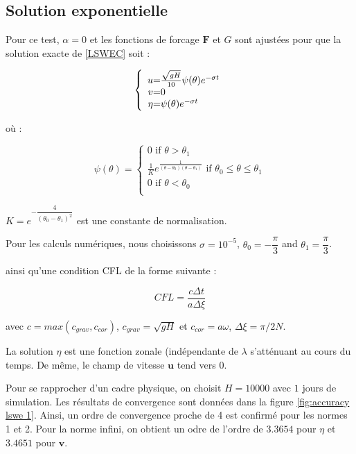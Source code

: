 \subsection{Solution exponentielle}

Pour ce test, $\alpha = 0$ et les fonctions de forcage $\mathbf{F}$ et $G$ sont ajustées pour que la solution exacte de \eqref{LSWEC} soit :

\begin{equation}
\left\lbrace
\begin{array}{r @{=} l}
u & \frac{\sqrt{gH}}{10} \psi ( \theta )  e^{-\sigma t} \\
v & 0 \\
\eta & \psi( \theta ) e^{-\sigma t}
\end{array}
\right.
\end{equation}

où :

\begin{equation*}
\psi ( \theta ) = 
\left\lbrace
\begin{array}{l}
0 \text{ if } \theta > \theta_1\\
\frac{1}{K}e^{\frac{1}{(\theta - \theta_0)(\theta-\theta_1)}} \text{ if } \theta_0 \leq \theta \leq \theta_1 \\
0 \text{ if } \theta < \theta_0\\
 
\end{array}
\right.
\label{galewski_fun}
\end{equation*}

$K = e^{-\dfrac{4}{(\theta_0 - \theta_1)^2}}$ est une constante de normalisation.

Pour les calculs numériques, nous choisissons $\sigma = 10^{-5}$, $\theta_0 = -\dfrac{\pi}{3}$ and $\theta_1 = \dfrac{\pi}{3}$.

ainsi qu'une condition CFL de la forme suivante :

\begin{equation}
CFL = \dfrac{c \Delta t}{a \Delta \xi}
\end{equation}

avec $c = max(c_{grav}, c_{cor})$, $c_{grav} = \sqrt{gH}$ et $c_{cor} = a \omega$, $\Delta \xi = \pi / 2N$.

La solution $\eta$ est une fonction zonale (indépendante de $\lambda$ s'atténuant au cours du temps. De même, le champ de vitesse $\mathbf{u}$ tend vers $0$.

Pour se rapprocher d'un cadre physique, on choisit $H=10000$ avec $1$ jours de simulation. Les résultats de convergence sont données dans la figure \ref{fig:accuracy lswe 1}. Ainsi, un ordre de convergence proche de 4 est confirmé pour les normes 1 et 2. Pour la norme infini, on obtient un odre de l'ordre de $3.3654$ pour $\eta$ et $3.4651$ pour $\mathbf{v}$.


